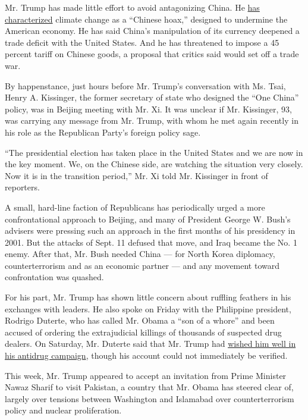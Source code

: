 Mr. Trump has made little effort to avoid antagonizing China. He
\href{https://twitter.com/realdonaldtrump/status/265895292191248385?lang=en}{has
characterized} climate change as a ``Chinese hoax,'' designed to
undermine the American economy. He has said China's manipulation of its
currency deepened a trade deficit with the United States. And he has
threatened to impose a 45 percent tariff on Chinese goods, a proposal
that critics said would set off a trade war.

By happenstance, just hours before Mr. Trump's conversation with Ms.
Tsai, Henry A. Kissinger, the former secretary of state who designed the
``One China'' policy, was in Beijing meeting with Mr. Xi. It was unclear
if Mr. Kissinger, 93, was carrying any message from Mr. Trump, with whom
he met again recently in his role as the Republican Party's foreign
policy sage.

``The presidential election has taken place in the United States and we
are now in the key moment. We, on the Chinese side, are watching the
situation very closely. Now it is in the transition period,'' Mr. Xi
told Mr. Kissinger in front of reporters.

A small, hard-line faction of Republicans has periodically urged a more
confrontational approach to Beijing, and many of President George W.
Bush's advisers were pressing such an approach in the first months of
his presidency in 2001. But the attacks of Sept. 11 defused that move,
and Iraq became the No. 1 enemy. After that, Mr. Bush needed China ---
for North Korea diplomacy, counterterrorism and as an economic partner
--- and any movement toward confrontation was quashed.

For his part, Mr. Trump has shown little concern about ruffling feathers
in his exchanges with leaders. He also spoke on Friday with the
Philippine president, Rodrigo Duterte, who has called Mr. Obama a ``son
of a whore'' and been accused of ordering the extrajudicial killings of
thousands of suspected drug dealers. On Saturday, Mr. Duterte said that
Mr. Trump had
\href{https://www.nytimes.com/2016/12/03/world/asia/philippines-rodrigo-duterte-donald-trump.html}{wished
him well in his antidrug campaign}, though his account could not
immediately be verified.

This week, Mr. Trump appeared to accept an invitation from Prime
Minister Nawaz Sharif to visit Pakistan, a country that Mr. Obama has
steered clear of, largely over tensions between Washington and Islamabad
over counterterrorism policy and nuclear proliferation.

